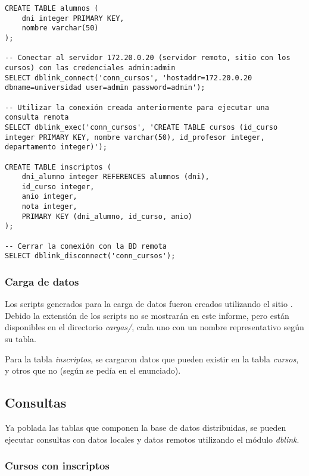 \vspace*{5mm}
\begin{lstlisting}[title=Definición de las tablas (el script SQL es \emph{crear\_tablas\_locales\_remotas.sql})]
CREATE TABLE alumnos (
    dni integer PRIMARY KEY,
    nombre varchar(50)
);

-- Conectar al servidor 172.20.0.20 (servidor remoto, sitio con los cursos) con las credenciales admin:admin
SELECT dblink_connect('conn_cursos', 'hostaddr=172.20.0.20 dbname=universidad user=admin password=admin');

-- Utilizar la conexión creada anteriormente para ejecutar una consulta remota
SELECT dblink_exec('conn_cursos', 'CREATE TABLE cursos (id_curso integer PRIMARY KEY, nombre varchar(50), id_profesor integer, departamento integer)');

CREATE TABLE inscriptos (
    dni_alumno integer REFERENCES alumnos (dni),
    id_curso integer,
    anio integer,
    nota integer,
    PRIMARY KEY (dni_alumno, id_curso, anio)
);

-- Cerrar la conexión con la BD remota
SELECT dblink_disconnect('conn_cursos');
\end{lstlisting}

\subsubsection{Carga de datos}

Los scripts generados para la carga de datos fueron creados utilizando el sitio \autocite{data}. Debido la extensión de los scripts no se mostrarán en este informe, pero están disponibles en el directorio \emph{cargas/}, cada uno con un nombre representativo según su tabla.

Para la tabla \emph{inscriptos}, se cargaron datos que pueden existir en la tabla \emph{cursos}, y otros que no (según se pedía en el enunciado).  

\subsection{Consultas}

Ya poblada las tablas que componen la base de datos distribuidas, se pueden ejecutar consultas con datos locales y datos remotos utilizando el módulo \emph{dblink}. 

\subsubsection{Cursos con inscriptos}


